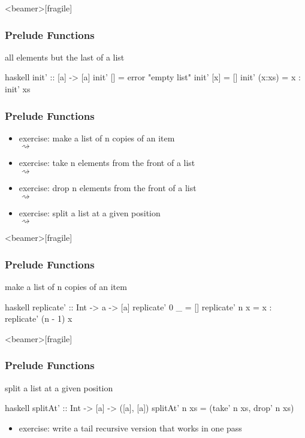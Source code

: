 \documentclass[dvipsnames]{beamer}
\theoremstyle{plain}
\begin{document}
\begin{frame}<beamer>[fragile]
  \frametitle{Prelude Functions}

  \begin{exampleblock}{all elements but the last of a list}
    \begin{pygments}{haskell}
init' :: [a] -> [a]
init' [] = error "empty list"
init' [x] = []
init' (x:xs) = x : init' xs
    \end{pygments}
  \end{exampleblock}
\end{frame}

\begin{frame}
  \frametitle{Prelude Functions}

  \begin{itemize}
    \item exercise: make a list of n copies of an item\\
       $\rightsquigarrow$
    \item exercise: take n elements from the front of a list\\
       $\rightsquigarrow$
    \item exercise: drop n elements from the front of a list\\
       $\rightsquigarrow$
    \item exercise: split a list at a given position\\
       $\rightsquigarrow$
  \end{itemize}
\end{frame}

\begin{frame}<beamer>[fragile]
  \frametitle{Prelude Functions}

  \begin{exampleblock}{make a list of n copies of an item}
    \begin{pygments}{haskell}
replicate' :: Int -> a -> [a]
replicate' 0 _ = []
replicate' n x = x : replicate' (n - 1) x
    \end{pygments}
  \end{exampleblock}
\end{frame}

\begin{frame}<beamer>[fragile]
  \frametitle{Prelude Functions}

  \begin{exampleblock}{split a list at a given position}
    \begin{pygments}{haskell}
splitAt' :: Int -> [a] -> ([a], [a])
splitAt' n xs = (take' n xs, drop' n xs)
    \end{pygments}
  \end{exampleblock}

  \pause
  \begin{itemize}
    \item exercise: write a tail recursive version that works in one pass
  \end{itemize}
\end{frame}
\end{document}
